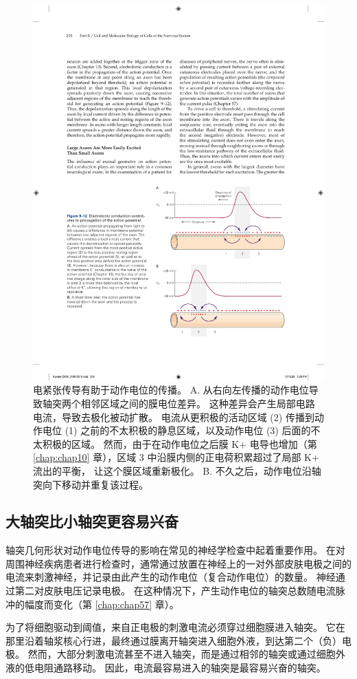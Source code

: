 \begin{figure}[htbp]
	\centering
	\includegraphics[width=0.7\linewidth]{chap09/fig_9_12}
	\caption{电紧张传导有助于动作电位的传播。 A. 从右向左传播的动作电位导致轴突两个相邻区域之间的膜电位差异。 这种差异会产生局部电路电流，导致去极化被动扩散。 电流从更积极的活动区域 (2) 传播到动作电位 (1) 之前的不太积极的静息区域，以及动作电位 (3) 后面的不太积极的区域。 然而，由于在动作电位之后膜 K+ 电导也增加（第 \ref{chap:chap10} 章），区域 3 中沿膜内侧的正电荷积累超过了局部 K+ 流出的平衡， 让这个膜区域重新极化。 B. 不久之后，动作电位沿轴突向下移动并重复该过程。}
	\label{fig:9_12}
\end{figure}



\subsection{大轴突比小轴突更容易兴奋}

轴突几何形状对动作电位传导的影响在常见的神经学检查中起着重要作用。 
在对周围神经疾病患者进行检查时，通常通过放置在神经上的一对外部皮肤电极之间的电流来刺激神经，并记录由此产生的动作电位（复合动作电位）的数量。 
神经通过第二对皮肤电压记录电极。 
在这种情况下，产生动作电位的轴突总数随电流脉冲的幅度而变化（第 \ref{chap:chap57} 章）。

为了将细胞驱动到阈值，来自正电极的刺激电流必须穿过细胞膜进入轴突。 
它在那里沿着轴浆核心行进，最终通过膜离开轴突进入细胞外液，到达第二个（负）电极。 
然而，大部分刺激电流甚至不进入轴突，而是通过相邻的轴突或通过细胞外液的低电阻通路移动。 
因此，电流最容易进入的轴突是最容易兴奋的轴突。


